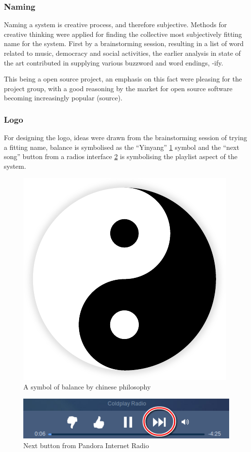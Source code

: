 
\subsubsection{Naming}
Naming a system is creative process, and therefore subjective. Methods for creative thinking were applied for finding the collective most subjectively fitting name for the system. First by a brainstorming session, resulting in a list of word related to music, democracy and social activities, the earlier analysis in state of the art contributed in supplying various buzzword and word endings, -ify.

This being a open source project, an emphasis on this fact were pleasing for the project group, with a good reasoning by the market for open source software becoming increasingly popular (source).

\subsubsection{Logo}
For designing the logo, ideas were drawn from the brainstorming session of trying a fitting name, balance is symbolised as the \enquote{Yinyang} \cref{fig:yinyang} symbol and the \enquote{next song} button from a radios interface \cref{fig:vlc} is symbolising the playlist aspect of the system.

\begin{figure}
  \centering
  \includegraphics[width=0.2\linewidth]{Images/Yin-Yang}
  \caption{A symbol of balance by chinese philosophy~\cite{yinyangsource} }
  \label{fig:yinyang}
\end{figure}

\begin{figure}
  \centering
  \includegraphics[scale=0.7]{Images/pandoraNext.png}
  \caption{Next button from Pandora Internet Radio}
  \label{fig:vlc}
\end{figure}


